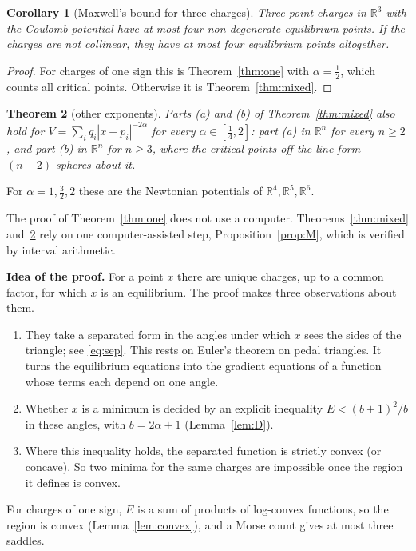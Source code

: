 \documentclass[11pt]{amsart}
\newtheorem{theorem}{Theorem}[section]
\newtheorem{corollary}[theorem]{Corollary}
\theoremstyle{remark}
\newcommand{\R}{\mathbb{R}}
\begin{document}
\begin{corollary}[Maxwell's bound for three charges]\label{cor:maxwell}
Three point charges in $\R^3$ with the Coulomb potential have at most four non-degenerate equilibrium points. If the
charges are not collinear, they have at most four equilibrium points altogether.
\end{corollary}

\begin{proof}
For charges of one sign this is Theorem~\ref{thm:one} with $\alpha=\tfrac12$, which counts all critical points.
Otherwise it is Theorem~\ref{thm:mixed}.
\end{proof}

\begin{theorem}[other exponents]\label{thm:alpha}
Parts (a) and (b) of Theorem~\ref{thm:mixed} also hold for $V=\sum_iq_i|x-p_i|^{-2\alpha}$ for every
$\alpha\in[\tfrac14,2]$: part (a) in $\R^n$ for every $n\ge2$, and part (b) in $\R^n$ for $n\ge3$, where the critical
points off the line form $(n-2)$-spheres about it.
\end{theorem}
For $\alpha=1,\tfrac32,2$ these are the Newtonian potentials of $\R^4,\R^5,\R^6$.

The proof of Theorem~\ref{thm:one} does not use a computer. Theorems~\ref{thm:mixed} and~\ref{thm:alpha} rely on one
computer-assisted step, Proposition~\ref{prop:M}, which is verified by interval arithmetic.

\medskip
\noindent\textbf{Idea of the proof.}
For a point $x$ there are unique charges, up to a common factor, for which $x$ is an equilibrium. The proof makes three
observations about them.
\begin{enumerate}
\item They take a separated form in the angles under which $x$ sees the sides of the triangle; see \eqref{eq:sep}. This
  rests on Euler's theorem on pedal triangles. It turns the equilibrium equations into the gradient equations of a
  function whose terms each depend on one angle.
\item Whether $x$ is a minimum is decided by an explicit inequality $E<(b+1)^2/b$ in these angles, with $b=2\alpha+1$
  (Lemma~\ref{lem:D}).
\item Where this inequality holds, the separated function is strictly convex (or concave). So two minima for the same
  charges are impossible once the region it defines is convex.
\end{enumerate}
For charges of one sign, $E$ is a sum of products of log-convex functions, so the region is convex
(Lemma~\ref{lem:convex}), and a Morse count gives at most three saddles.
\end{document}
